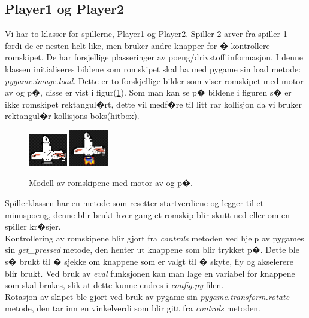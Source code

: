 {\subsection{Player1 og Player2}

Vi har to klasser for spillerne, Player1 og Player2. Spiller 2 arver fra spiller 1 fordi de er nesten helt like, men bruker andre knapper for � kontrollere romskipet. De har forsjellige plasseringer av poeng/drivstoff informasjon. I denne klassen initialiseres bildene som romskipet skal ha med pygame sin load metode: \emph{pygame.image.load}. Dette er to forskjellige bilder som viser romskipet med motor av og p�, disse er vist i figur(\ref{skips}). Som man kan se p� bildene i figuren s� er ikke romskipet rektangul�rt, dette vil medf�re til litt rar kollisjon da vi bruker rektangul�r kollisjons-boks(hitbox). 

\begin{figure}[hbt!]
{\centering
    \includegraphics[width=0.15\textwidth]{ship1.jpg} \includegraphics[width=0.15\textwidth]{ship2.jpg}
    \caption{Modell av romskipene med motor av og p�.}
    \label{skips}
\par}
\end{figure}


Spillerklassen har en metode som resetter startverdiene og legger til et minuspoeng, denne blir brukt hver gang et romskip blir skutt ned eller om en spiller kr�sjer. \\

Kontrollering av romskipene blir gjort fra \emph{controls} metoden ved hjelp av pygames sin \emph{get\_pressed} metode, den henter ut knappene som blir trykket p�. Dette ble s� brukt til � sjekke om knappene som er valgt til � skyte, fly og akselerere blir brukt. Ved bruk av \emph{eval} funksjonen kan man lage en variabel for knappene som skal brukes, slik at dette kunne endres i \emph{config.py} filen. \\

Rotasjon av skipet ble gjort ved bruk av pygame sin \emph{pygame.transform.rotate} metode, den tar inn en vinkelverdi som blir gitt fra \emph{controls} metoden. \\ 

}
